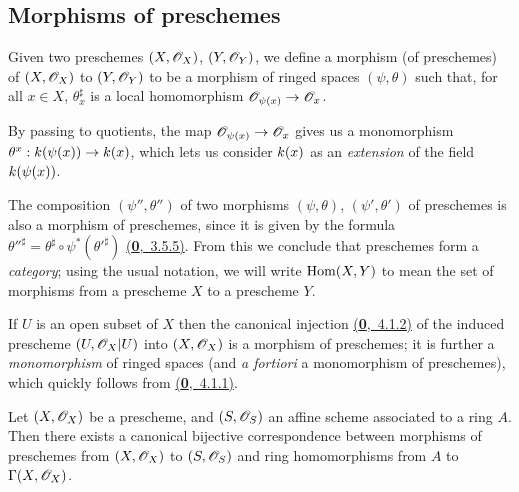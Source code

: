 \subsection{Morphisms of preschemes}
\label{subsection-prescheme-morphisms}

\begin{defn}[2.2.1]
\label{defn-1.2.2.1}
Given two preschemes $(X,\mathscr{O}_X)$, $(Y,\mathscr{O}_Y)$, we
define a morphism (of preschemes) of $(X,\mathscr{O}_X)$ to $(Y,\mathscr{O}_Y)$ to be a morphism
of ringed spaces $(\psi,\theta)$ such that, for all $x\in X$, $\theta_x^\sharp$ is a
local homomorphism $\mathscr{O}_{\psi(x)}\to\mathscr{O}_x$.
\end{defn}

By passing to quotients, the map $\mathscr{O}_{\psi(x)}\to\mathscr{O}_x$ gives us a monomorphism
$\theta^x:k(\psi(x))\to k(x)$, which lets us consider $k(x)$ as an
{\em extension} of the field $k(\psi(x))$.

\begin{env}[2.2.2]
\label{env-1.2.2.2}
The composition $(\psi'',\theta'')$ of two morphisms
$(\psi,\theta)$, $(\psi',\theta')$ of preschemes is also a morphism of
preschemes, since it is given by the formula
${\theta''}^\sharp=\theta^\sharp\circ\psi^*({\theta'}^\sharp)$ \hyperref[env-0.3.5.5]{(\textbf{0},~3.5.5)}. From this
we conclude that preschemes form a {\em category}; using the usual notation, we
will write ${\mathop{\mathrm{Hom}}\nolimits}(X,Y)$ to mean the set of morphisms from a prescheme $X$ to a
prescheme $Y$.
\end{env}

\begin{exm}[2.2.3]
\label{exm-1.2.2.3}
If $U$ is an open subset of $X$ then the canonical
injection \hyperref[env-0.4.1.2]{(\textbf{0},~4.1.2)} of the induced prescheme $(U,\mathscr{O}_X|U)$ into
$(X,\mathscr{O}_X)$ is a morphism of preschemes; it is further a {\em monomorphism} of
ringed spaces (and {\em a fortiori} a monomorphism of preschemes), which
quickly follows from \hyperref[env-0.4.1.1]{(\textbf{0},~4.1.1)}.
\end{exm}

\begin{prop}[2.2.4]
\label{prop-1.2.2.4}
Let $(X,\mathscr{O}_X)$ be a prescheme, and $(S,\mathscr{O}_S)$ an
affine scheme associated to a ring $A$. Then there exists a canonical bijective
correspondence between morphisms of preschemes from $(X,\mathscr{O}_X)$ to $(S,\mathscr{O}_S)$ and
ring homomorphisms from $A$ to $\Gamma(X,\mathscr{O}_X)$.
\end{prop}

